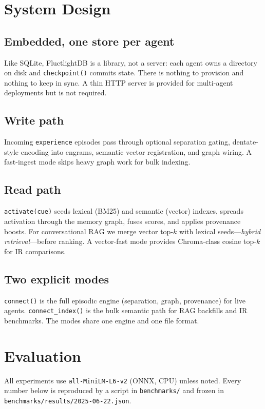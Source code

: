 \documentclass[11pt]{article}
\begin{document}
\section{System Design}
\subsection{Embedded, one store per agent}
Like SQLite, FluctlightDB is a library, not a server: each agent owns a directory
on disk and \texttt{checkpoint()} commits state. There is nothing to provision and
nothing to keep in sync. A thin HTTP server is provided for multi-agent
deployments but is not required.

\subsection{Write path}
Incoming \texttt{experience} episodes pass through optional separation gating,
dentate-style encoding into engrams, semantic vector registration, and graph
wiring. A fast-ingest mode skips heavy graph work for bulk indexing.

\subsection{Read path}
\texttt{activate(cue)} seeds lexical (BM25) and semantic (vector) indexes, spreads
activation through the memory graph, fuses scores, and applies provenance boosts.
For conversational RAG we merge vector top-$k$ with lexical seeds---\emph{hybrid
retrieval}---before ranking. A vector-fast mode provides Chroma-class cosine
top-$k$ for IR comparisons.

\subsection{Two explicit modes}
\texttt{connect()} is the full episodic engine (separation, graph, provenance) for
live agents. \texttt{connect\_index()} is the bulk semantic path for RAG backfills
and IR benchmarks. The modes share one engine and one file format.

\section{Evaluation}
All experiments use \texttt{all-MiniLM-L6-v2} (ONNX, CPU) unless noted. Every
number below is reproduced by a script in \texttt{benchmarks/} and frozen in
\texttt{benchmarks/results/2025-06-22.json}.
\end{document}
